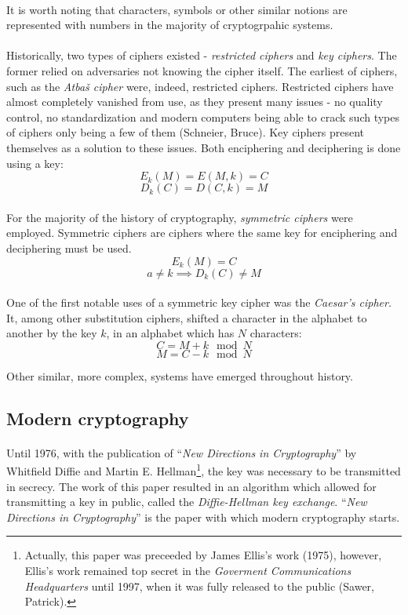 \documentclass[a4paper, 10pt]{article}
\begin{document}
\paragraph*{}
It is worth noting that characters, symbols or other similar notions are represented with numbers in the majority of 
cryptogrpahic systems.

\paragraph*{}
Historically, two types of ciphers existed - \textit{restricted ciphers} and \textit{key ciphers}. The former relied 
on adversaries not knowing the cipher itself. The earliest of ciphers, such as the \textit{Atba\v{s} cipher} were, 
indeed, restricted ciphers. Restricted ciphers have almost completely vanished from use, as they present many issues - 
no quality control, no standardization and modern computers being able to crack such types of ciphers only being a few 
of them (Schneier, Bruce). Key ciphers present themselves as a solution to these issues. Both enciphering and 
deciphering is done using a key:
$$E_k(M) = E(M, k) = C$$
$$D_k(C) = D(C, k) = M$$

\paragraph*{}
For the majority of the history of cryptography, \textit{symmetric ciphers} were employed. Symmetric ciphers are 
ciphers where the same key for enciphering and deciphering must be used.
$$E_k(M) = C$$
$$a \neq k \implies D_k(C) \neq M$$

\paragraph*{}
One of the first notable uses of a symmetric key cipher was the \textit{Caesar's cipher}. It, among other substitution 
ciphers, shifted a character in the alphabet to another by the key $k$, in an alphabet which has $N$ characters:
$$C = M + k \mod N$$
$$M = C - k \mod N$$

Other similar, more complex, systems have emerged throughout history.

\subsection{Modern cryptography}
\paragraph*{}
Until 1976, with the publication of ``\textit{New Directions in Cryptography}'' by Whitfield Diffie and Martin E. 
Hellman\footnote{Actually, this paper was preceeded by James Ellis's work (1975), however, Ellis's work remained top 
secret in the \textit{Goverment Communications Headquarters} until 1997, when it was fully released to the public 
(Sawer, Patrick).}, the key was necessary to be transmitted in secrecy. The work of this paper resulted in an algorithm
 which allowed for transmitting a key in public, called the \textit{Diffie-Hellman key exchange}. 
``\textit{New Directions in Cryptography}'' is the paper with which modern cryptography starts.
\end{document}

